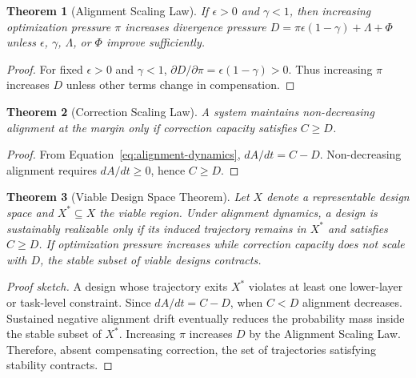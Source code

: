 \documentclass[11pt]{article}
\newtheorem{theorem}{Theorem}
\newcommand{\Xstar}{X^*}
\newcommand{\eps}{\epsilon}
\newcommand{\gam}{\gamma}
\begin{document}
\begin{theorem}[Alignment Scaling Law]
If $\eps>0$ and $\gam<1$, then increasing optimization pressure $\pi$ increases divergence pressure $D=\pi\eps(1-\gam)+\Lambda+\Phi$ unless $\eps$, $\gam$, $\Lambda$, or $\Phi$ improve sufficiently.
\end{theorem}
\begin{proof}
For fixed $\eps>0$ and $\gam<1$, $\partial D/\partial \pi=\eps(1-\gam)>0$. Thus increasing $\pi$ increases $D$ unless other terms change in compensation.
\end{proof}

\begin{theorem}[Correction Scaling Law]
A system maintains non-decreasing alignment at the margin only if correction capacity satisfies $C\ge D$.
\end{theorem}
\begin{proof}
From Equation~\ref{eq:alignment-dynamics}, $dA/dt=C-D$. Non-decreasing alignment requires $dA/dt\ge 0$, hence $C\ge D$.
\end{proof}

\begin{theorem}[Viable Design Space Theorem]
Let $X$ denote a representable design space and $\Xstar\subseteq X$ the viable region. Under alignment dynamics, a design is sustainably realizable only if its induced trajectory remains in $\Xstar$ and satisfies $C\ge D$. If optimization pressure increases while correction capacity does not scale with $D$, the stable subset of viable designs contracts.
\end{theorem}
\begin{proof}[Proof sketch]
A design whose trajectory exits $\Xstar$ violates at least one lower-layer or task-level constraint. Since $dA/dt=C-D$, when $C<D$ alignment decreases. Sustained negative alignment drift eventually reduces the probability mass inside the stable subset of $\Xstar$. Increasing $\pi$ increases $D$ by the Alignment Scaling Law. Therefore, absent compensating correction, the set of trajectories satisfying stability contracts.
\end{proof}
\end{document}
